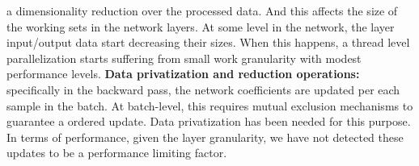 a dimensionality reduction over the processed data.
And this affects the size of the working sets in the network layers.
At some level in the network, the layer input/output data start decreasing their sizes. When this happens, a thread level parallelization
starts suffering from small work granularity with modest performance levels.
\textbf{Data privatization and reduction operations:} specifically in the
backward pass, the network coefficients are updated per each
sample in the batch. At batch-level, this requires mutual exclusion
mechanisms to guarantee a ordered update. Data privatization has
been needed for this purpose. In terms of performance, given the 
layer granularity, we have not detected these updates to be a 
performance limiting factor.


